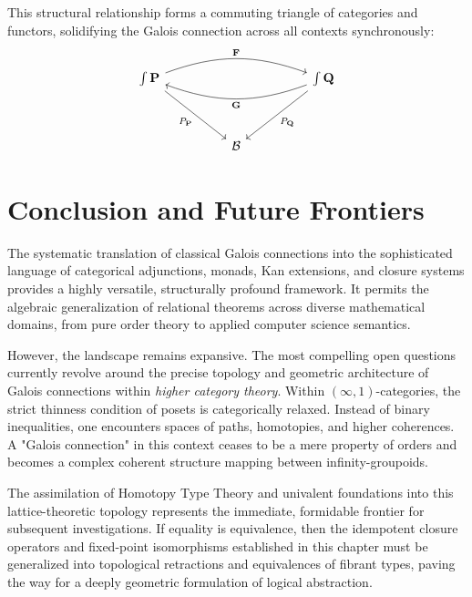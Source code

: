 This structural relationship forms a commuting triangle of categories and functors, solidifying the Galois connection across all contexts synchronously:
\[\begin{tikzcd}[row sep=huge, column sep=huge]
\int \mathbf{P} \arrow[rr, "\mathbf{F}", bend left=20] \arrow[dr, "P_{\mathbf{P}}"'] & & \int \mathbf{Q} \arrow[ll, "\mathbf{G}", bend left=20] \arrow[dl, "P_{\mathbf{Q}}"] \\
& \mathcal{B} &
\end{tikzcd}\]

\section{Conclusion and Future Frontiers}

The systematic translation of classical Galois connections into the sophisticated language of categorical adjunctions, monads, Kan extensions, and closure systems provides a highly versatile, structurally profound framework. It permits the algebraic generalization of relational theorems across diverse mathematical domains, from pure order theory to applied computer science semantics. 

However, the landscape remains expansive. The most compelling open questions currently revolve around the precise topology and geometric architecture of Galois connections within \emph{higher category theory}. Within $(\infty, 1)$-categories, the strict thinness condition of posets is categorically relaxed. Instead of binary inequalities, one encounters spaces of paths, homotopies, and higher coherences. A "Galois connection" in this context ceases to be a mere property of orders and becomes a complex coherent structure mapping between infinity-groupoids.

The assimilation of Homotopy Type Theory and univalent foundations into this lattice-theoretic topology represents the immediate, formidable frontier for subsequent investigations. If equality is equivalence, then the idempotent closure operators and fixed-point isomorphisms established in this chapter must be generalized into topological retractions and equivalences of fibrant types, paving the way for a deeply geometric formulation of logical abstraction.
